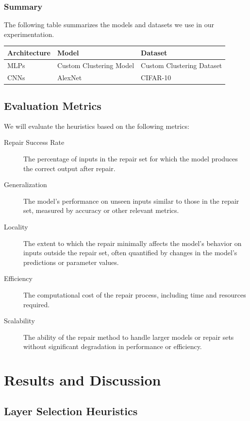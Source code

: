 \documentclass{article}
\begin{document}
\subsubsection{Summary}

The following table summarizes the models and datasets we use in our experimentation.

\begin{longtable}{p{} p{} p{}}
	\toprule
	\textbf{Architecture} & \textbf{Model}          & \textbf{Dataset}          \\
	\midrule
	\endhead
	\bottomrule
	\endfoot
	\bottomrule
	\endlastfoot
	MLPs                  & Custom Clustering Model & Custom Clustering Dataset \\
	\midrule
	CNNs                  & AlexNet \cite{alexnet}  & CIFAR-10 \cite{cifar_10}  \\
\end{longtable}

\subsection{Evaluation Metrics}
We will evaluate the heuristics based on the following metrics:
\begin{description}
	\item[Repair Success Rate] The percentage of inputs in the repair set for which the model produces the correct output after repair.
	\item[Generalization] The model's performance on unseen inputs similar to those in the repair set, measured by accuracy or other relevant metrics.
	\item[Locality] The extent to which the repair minimally affects the model's behavior on inputs outside the repair set, often quantified by changes in the model's predictions or parameter values.
	\item[Efficiency] The computational cost of the repair process, including time and resources required.
	\item[Scalability] The ability of the repair method to handle larger models or repair sets without significant degradation in performance or efficiency.
\end{description}

\section{Results and Discussion}

\subsection{Layer Selection Heuristics}
\end{document}
